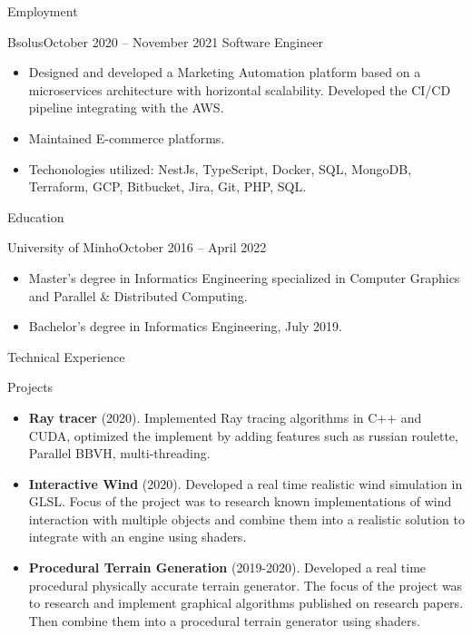 \documentclass[]{mcdowellcv}
\begin{document}
	\makeheader

	\begin{cvsection}{Employment}
		\begin{cvsubsection}{Bsolus}{}{October 2020 -- November 2021}
			Software Engineer
			\begin{itemize}
                \item Designed and developed a Marketing Automation platform based on a microservices architecture with horizontal scalability. Developed the CI/CD pipeline integrating with the AWS.
                \item Maintained E-commerce platforms.
                \item Techonologies utilized: NestJs, TypeScript, Docker, SQL, MongoDB, Terraform, GCP, Bitbucket, Jira, Git, PHP, SQL.
			\end{itemize}
		\end{cvsubsection}
	\end{cvsection}

	\begin{cvsection}{Education}
		\begin{cvsubsection}{University of Minho}{}{October 2016 -- April 2022}
			\begin{itemize}
                \item Master’s degree in Informatics Engineering specialized in Computer Graphics and Parallel \& Distributed Computing.
                \item Bachelor's degree in Informatics Engineering, July 2019.
			\end{itemize}
		\end{cvsubsection}
	\end{cvsection}

	\begin{cvsection}{Technical Experience}
		\begin{cvsubsection}{Projects}{}{}
			\begin{itemize}
				\item \textbf{Ray tracer} (2020). Implemented Ray tracing algorithms in C++ and CUDA, optimized the implement by adding features such as russian roulette, Parallel BBVH, multi-threading.
				\item \textbf{Interactive Wind} (2020). Developed a real time realistic wind simulation in GLSL. Focus of the project was to research known implementations of wind interaction with multiple objects and combine them into a realistic solution to integrate with an engine using shaders.
				\item \textbf{Procedural Terrain Generation} (2019-2020). Developed a real time procedural physically accurate terrain generator. The focus of the project was to research and implement graphical algorithms published on research papers. Then combine them into a procedural terrain generator using shaders.
			\end{itemize}
		\end{cvsubsection}
	\end{cvsection}
\end{document}

